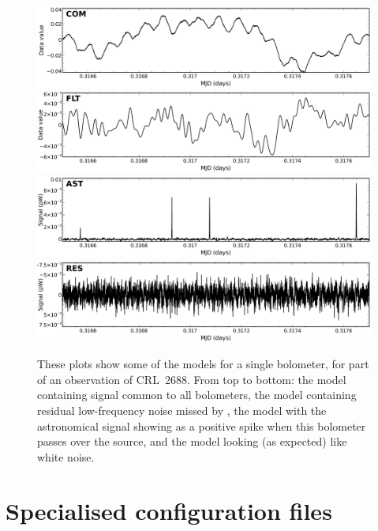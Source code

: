 \begin{figure}
\begin{center}
  \includegraphics[width=\linewidth]{sc21_com} \\
  \includegraphics[width=\linewidth]{sc21_flt} \\
  \includegraphics[width=\linewidth]{sc21_ast} \\
  \includegraphics[width=\linewidth]{sc21_res} \\
\end{center}
\caption[Iterative models in the time domain]{\small These plots show
some of the models for a single bolometer, for part of an
observation of CRL~2688. From top to bottom: the  model
containing signal common to all bolometers, the  model
containing residual low-frequency noise missed by , the
 model with the astronomical signal showing as a positive
spike when this bolometer passes over the source, and the 
model looking (as expected) like white noise.}
\label{fig:itercomp}
\end{figure}


\section{Specialised configuration files}
\label{sec:config}

